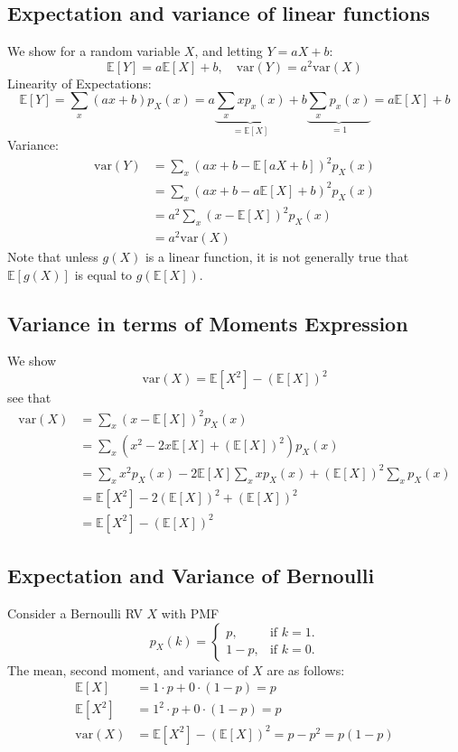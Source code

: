 \documentclass{report}
\begin{document}
\subsection{Expectation and variance of linear functions}
We show for a random variable $X$, and letting $Y=aX+b$:
\begin{equation*}
\boxed{\mathbb{E}[Y]=a\mathbb{E}[X]+b,\quad
\text{var}(Y)=a^2\text{var}(X)}
\end{equation*}
Linearity of Expectations:
\begin{equation*}
\mathbb{E}[Y]=\sum_x(ax+b)p_X(x)=a\underbrace{\sum_xxp_x(x)}_{=\mathbb{E}[X]}+b\underbrace{\sum_xp_x(x)}_{=1}
=a\mathbb{E}[X]+b
\end{equation*}
Variance:
\begin{align*}
\text{var}(Y)&=\sum_x(ax+b-\mathbb{E}[aX+b])^2p_X(x)\\
&=\sum_x(ax+b-a\mathbb{E}[X]+b)^2p_X(x)\\
&=a^2\sum_x(x-\mathbb{E}[X])^2p_X(x)\\
&=a^2\text{var}(X)
\end{align*}
Note that unless $g(X)$ is a linear function, it is not generally true that $\mathbb{E}[g(X)]$ is equal to 
$g(\mathbb{E}[X])$.

\subsection{Variance in terms of Moments Expression}
We show
\begin{equation*}
\boxed{\text{var}(X)=\mathbb{E}[X^2]-(\mathbb{E}[X])^2}
\end{equation*}
see that
\begin{align*}
\text{var}(X)&=\sum_x(x-\mathbb{E}[X])^2p_X(x)\\
&=\sum_x(x^2-2x\mathbb{E}[X]+(\mathbb{E}[X])^2)p_X(x)\\
&=\sum_xx^2p_X(x)-2\mathbb{E}[X]\sum_xxp_X(x)+(\mathbb{E}[X])^2\sum_xp_X(x)\\
&=\mathbb{E}[X^2]-2(\mathbb{E}[X])^2+(\mathbb{E}[X])^2\\
&=\mathbb{E}[X^2]-(\mathbb{E}[X])^2
\end{align*}
\newpage

\subsection{Expectation and Variance of Bernoulli}
Consider a Bernoulli RV $X$ with PMF
\begin{equation*}
p_X(k)=\begin{cases}
p,&\text{if }k=1.\\
1-p,&\text{if }k=0.
\end{cases}
\end{equation*}
The mean, second moment, and variance of $X$ are as follows:
\begin{align*}
\mathbb{E}[X]&=1\cdot p+0\cdot(1-p)=p\\
\mathbb{E}[X^2]&=1^2\cdot p+0\cdot(1-p)=p\\
\text{var}(X)&=\mathbb{E}[X^2]-(\mathbb{E}[X])^2
=p-p^2=p(1-p)
\end{align*}
\end{document}

